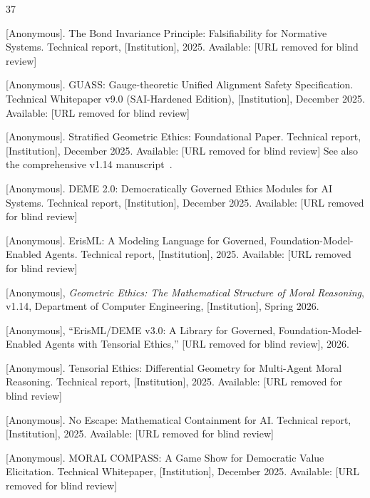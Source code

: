 \documentclass[12pt]{article}
\begin{document}
\begin{thebibliography}{37}

[Anonymous].
\newblock The Bond Invariance Principle: Falsifiability for Normative Systems.
\newblock Technical report, [Institution], 2025.
\newblock Available: [URL removed for blind review]

[Anonymous].
\newblock GUASS: Gauge-theoretic Unified Alignment Safety Specification.
\newblock Technical Whitepaper v9.0 (SAI-Hardened Edition), [Institution], December 2025.
\newblock Available: [URL removed for blind review]

[Anonymous].
\newblock Stratified Geometric Ethics: Foundational Paper.
\newblock Technical report, [Institution], December 2025.
\newblock Available: [URL removed for blind review]
\newblock See also the comprehensive v1.14 manuscript~\cite{bond2026ge}.

[Anonymous].
\newblock DEME 2.0: Democratically Governed Ethics Modules for AI Systems.
\newblock Technical report, [Institution], December 2025.
\newblock Available: [URL removed for blind review]

[Anonymous].
\newblock ErisML: A Modeling Language for Governed, Foundation-Model-Enabled Agents.
\newblock Technical report, [Institution], 2025.
\newblock Available: [URL removed for blind review]

[Anonymous], \emph{Geometric Ethics: The Mathematical Structure of Moral Reasoning}, v1.14, Department of Computer Engineering, [Institution], Spring 2026.

[Anonymous], ``ErisML/DEME v3.0: A Library for Governed, Foundation-Model-Enabled Agents with Tensorial Ethics,'' [URL removed for blind review], 2026.

[Anonymous].
\newblock Tensorial Ethics: Differential Geometry for Multi-Agent Moral Reasoning.
\newblock Technical report, [Institution], 2025.
\newblock Available: [URL removed for blind review]

[Anonymous].
\newblock No Escape: Mathematical Containment for AI.
\newblock Technical report, [Institution], 2025.
\newblock Available: [URL removed for blind review]

[Anonymous].
\newblock MORAL COMPASS: A Game Show for Democratic Value Elicitation.
\newblock Technical Whitepaper, [Institution], December 2025.
\newblock Available: [URL removed for blind review]


\end{thebibliography}
\end{document}
